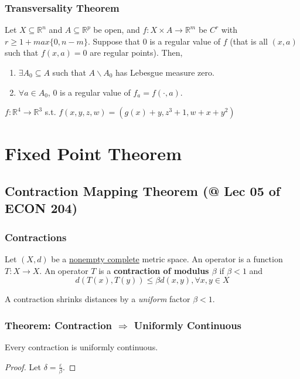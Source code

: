 \documentclass[11pt]{elegantbook}
\begin{document}
\subsection{Transversality Theorem}
\begin{theorem}
    Let $X \subseteq \mathbb{R}^n$ and $A \subseteq \mathbb{R}^p$ be open, and $f : X \times A \rightarrow \mathbb{R}^m$ be $C^r$ with $r \geq 1 + max\{0, n - m\}$. Suppose that $0$ is a regular value of $f$ (that is all $(x,a)$ such that $f(x,a)=0$ are regular points). Then,
    \begin{enumerate}
        \item $\exists A_0 \subseteq A$ such that $A \backslash A_0$ has Lebesgue measure zero.
        \item $\forall a \in A_0$, $0$ is a regular value of $f_a = f(\cdot, a)$.
    \end{enumerate}
\end{theorem}
\begin{example}
    $f: \mathbb{R}^4 \rightarrow \mathbb{R}^3$ s.t. $f(x,y,z,w)=(g(x)+y,z^3+1,w+x+y^2)$
\end{example}


\chapter{Fixed Point Theorem}

\section{Contraction Mapping Theorem \small{(@ Lec 05 of ECON 204)}}
\subsection{Contractions}
\begin{definition}
    \normalfont
    Let $(X, d)$ be a \underline{nonempty complete} metric space. An operator is a function $T : X \rightarrow X$. An operator $T$ is a \textbf{contraction of modulus $\beta$} if $\beta < 1$ and $$d(T(x), T(y)) \leq \beta d(x, y), \forall x,y\in X$$
\end{definition}
A contraction shrinks distances by a \textit{uniform} factor $\beta < 1$.

\subsection{Theorem: Contraction $\Rightarrow$ Uniformly Continuous}
\begin{theorem}
    Every contraction is uniformly continuous.
\end{theorem}
\begin{proof}
    Let $\delta=\frac{\varepsilon}{\beta}$.
\end{proof}
\end{document}
